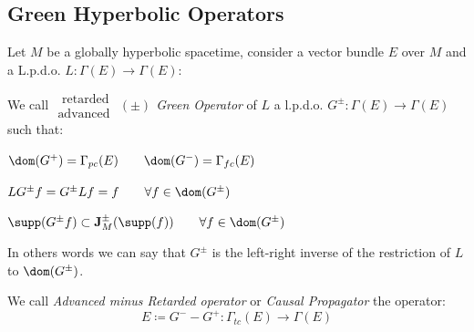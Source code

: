 \documentclass[Main]{subfiles}
\begin{document}
		\subsection{Green Hyperbolic Operators}	
			Let $M$ be a globally hyperbolic spacetime, consider a vector bundle $E$ over $M$ and a L.p.d.o. $L: \Gamma(E) \rightarrow \Gamma(E)$:
			\begin{definition}\label{Def:GreenOperators}
				We call \emph{$\substack{\textrm{ retarded}\\ \textrm{advanced } } (\pm)$ Green Operator} of $L$ a 
				l.p.d.o. $G^\pm : \Gamma (E) \rightarrow \Gamma(E)$ such that:
				\begin{compactitemize}
					\item $\dom(G^+) = \Gamma_{pc}(E) \qquad \dom(G^-) = \Gamma_{fc}(E)$
					\item $LG^\pm f=G^\pm Lf = f \qquad \forall f\in \dom(G^\pm)$
					\item $\supp(G^\pm f) \subset \mathbf{J}^\pm_M (\supp(f)) \qquad \forall f\in \dom(G^\pm)$
				\end{compactitemize}
			\end{definition}
				In others words we can say that 
				$G^\pm$ is the left-right inverse of the restriction of $L$ to $\dom(G^\pm)$.
			\begin{notationfix}
			
				We call \emph{Advanced minus Retarded operator} or \emph{Causal Propagator}\cite{Benini2013} the operator:
				\begin{displaymath}
					E \coloneqq G^-  - G^+ : \Gamma_{tc}(E) \rightarrow \Gamma(E)
				\end{displaymath}
			\end{notationfix}		
		
\end{document}
